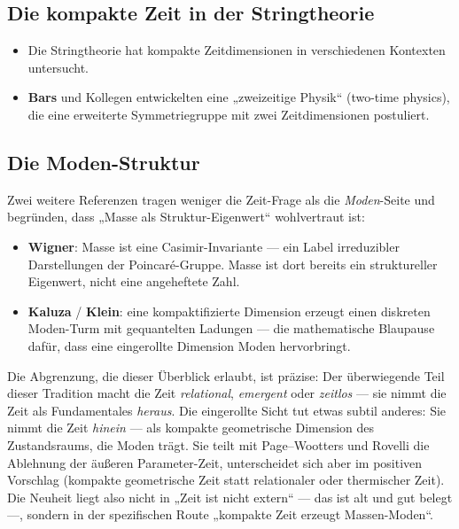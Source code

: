 \subsection{Die kompakte Zeit in der Stringtheorie}
\begin{itemize}[leftmargin=1.4em,itemsep=0.25em]
 \item Die Stringtheorie hat kompakte Zeitdimensionen in verschiedenen Kontexten untersucht.
 \item \textbf{Bars} und Kollegen entwickelten eine „zweizeitige Physik`` (two-time physics), die eine erweiterte Symmetriegruppe mit zwei Zeitdimensionen postuliert.
\end{itemize}

\subsection{Die Moden-Struktur}
Zwei weitere Referenzen tragen weniger die Zeit-Frage als die \emph{Moden}-Seite und begründen, dass „Masse als Struktur-Eigenwert`` wohlvertraut ist:
\begin{itemize}[leftmargin=1.4em,itemsep=0.25em]
 \item \textbf{Wigner}: Masse ist eine Casimir-Invariante --- ein Label irreduzibler Darstellungen der Poincaré-Gruppe. Masse ist dort bereits ein struktureller Eigenwert, nicht eine angeheftete Zahl.
 \item \textbf{Kaluza} / \textbf{Klein}: eine kompaktifizierte Dimension erzeugt einen diskreten Moden-Turm mit gequantelten Ladungen --- die mathematische Blaupause dafür, dass eine eingerollte Dimension Moden hervorbringt.
\end{itemize}

Die Abgrenzung, die dieser Überblick erlaubt, ist präzise: Der überwiegende Teil dieser Tradition macht die Zeit \emph{relational}, \emph{emergent} oder \emph{zeitlos} --- sie nimmt die Zeit als Fundamentales \emph{heraus}. Die eingerollte Sicht tut etwas subtil anderes: Sie nimmt die Zeit \emph{hinein} --- als kompakte geometrische Dimension des Zustandsraums, die Moden trägt. Sie teilt mit Page--Wootters und Rovelli die Ablehnung der äußeren Parameter-Zeit, unterscheidet sich aber im positiven Vorschlag (kompakte geometrische Zeit statt relationaler oder thermischer Zeit). Die Neuheit liegt also nicht in „Zeit ist nicht extern`` --- das ist alt und gut belegt ---, sondern in der spezifischen Route „kompakte Zeit erzeugt Massen-Moden``.

